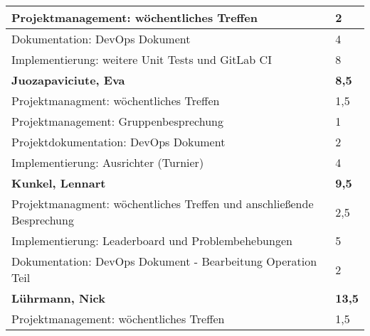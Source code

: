 \documentclass[a4paper,11pt]{scrartcl}
\begin{document}
\begin{longtable}{| p{13.8cm} | C{2.4cm} |}
	Projektmanagement: wöchentliches Treffen
	&
	2
	\\
	\hline

	Dokumentation: DevOps Dokument
	&
	4
	\\
	\hline

  Implementierung: weitere Unit Tests und GitLab CI
	&
  8
	\\
	\hline
	\hline


	\textbf{Juozapaviciute, Eva} & \textbf{8,5}\\ %
	\hline

  Projektmanagment: wöchentliches Treffen
	&
  1,5
	\\
	\hline

  Projektmanagement: Gruppenbesprechung
	&
  1
	\\
	\hline

  Projektdokumentation: DevOps Dokument
	&
  2
	\\
	\hline

  Implementierung: Ausrichter (Turnier)
	&
  4
	\\
	\hline
	\hline


	\textbf{Kunkel, Lennart} & \textbf{9,5}\\ %
	\hline

  Projektmanagment: wöchentliches Treffen und anschließende Besprechung
	&
  2,5
	\\
	\hline

  Implementierung: Leaderboard und Problembehebungen
	&
  5
	\\
	\hline

  Dokumentation: DevOps Dokument - Bearbeitung Operation Teil
	&
  2
	\\
	\hline
	\hline


	\textbf{Lührmann, Nick} & \textbf{13,5}\\ %
	\hline

	Projektmanagement: wöchentliches Treffen
	&
	1,5
	\\
	\hline


\end{longtable}
\end{document}
